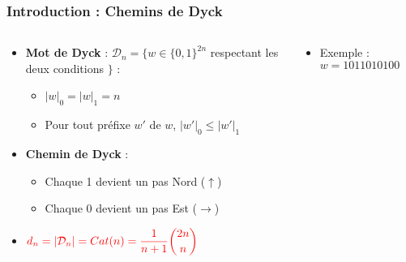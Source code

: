 \documentclass{beamer}
\begin{document}
\begin{frame}
    \frametitle{Introduction : Chemins de Dyck}
    \begin{columns}
        \begin{column}{0.6\textwidth}
            \begin{itemize}
                \item \textbf{Mot de Dyck} : $\mathcal{D}_n = \{w \in
                    \{0,1\}^{2n}$ respectant les deux conditions $\}$ :
                \begin{itemize}
                    \item $|w|_0 = |w|_1 = n$
                    \item Pour tout préfixe $w'$ de $w$, $|w'|_0 \leqslant
                        |w'|_1$
                \end{itemize}
                \item \textbf{Chemin de Dyck} :
                \begin{itemize}
                    \item Chaque 1 devient un pas Nord ($\uparrow$)
                    \item Chaque 0 devient un pas Est ($\rightarrow$)
                \end{itemize}
                \item $\color{red}{\displaystyle d_n = |\mathcal{D}_n| =
                    Cat(n) = \frac{1}{n+1}\binom{2n}{n}}$
            \end{itemize}
        \end{column}
        \begin{column}{0.4\textwidth}
            \begin{itemize}
                \item Exemple : $w = 1011010100$
            \end{itemize}
            
        \end{column}
    \end{columns}
\end{frame}
\end{document}
